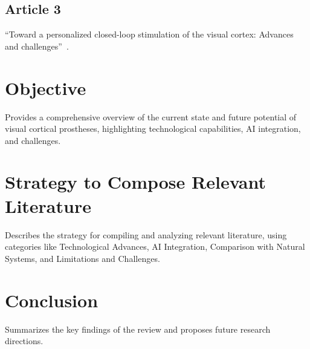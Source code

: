 \documentclass[twocolumn,10pt]{article}
\begin{document}
\subsection{Article 3}
``Toward a personalized closed-loop stimulation of the visual cortex: Advances and challenges''~\cite{graniPersonalizedClosedloopStimulation2022}.

\section{Objective}\label{sec:objective}
Provides a comprehensive overview of the current state and future potential of visual cortical prostheses, highlighting technological capabilities, AI integration, and challenges.

\section{Strategy to Compose Relevant Literature}\label{sec:strategy}
Describes the strategy for compiling and analyzing relevant literature, using categories like Technological Advances, AI Integration, Comparison with Natural Systems, and Limitations and Challenges.

\section{Conclusion}\label{sec:conclusion}
Summarizes the key findings of the review and proposes future research directions.

\printbibliography%
\end{document}
